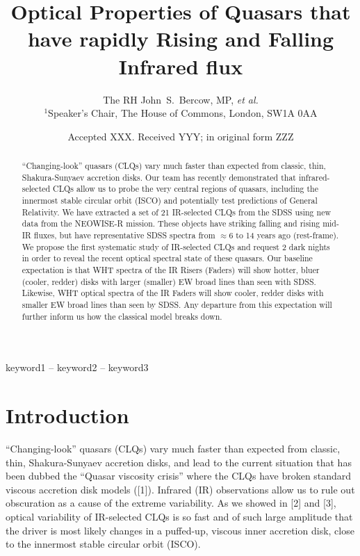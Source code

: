 \documentclass[a4paper,fleqn,usenatbib]{mnras}
\title[Infrared CLQs from WHT]
{Optical Properties of Quasars that have rapidly Rising and Falling Infrared flux}
\author[Bercow]
{The RH John~S.~Bercow, MP, {\it et al.} 
\\
$^{1}$Speaker's Chair, The House of Commons, London, SW1A 0AA \\
}
\date{Accepted XXX. Received YYY; in original form ZZZ}
\begin{document}
\label{firstpage}
\pagerange{\pageref{firstpage}--\pageref{lastpage}}
\maketitle

\begin{abstract}
``Changing-look'' quasars (CLQs) vary much faster than expected from
classic, thin, Shakura-Sunyaev accretion disks. Our team has recently
demonstrated that infrared-selected CLQs allow us to probe the very
central regions of quasars, including the innermost stable circular
orbit (ISCO) and potentially test predictions of General
Relativity. We have extracted a set of 21 IR-selected CLQs from the
SDSS using new data from the NEOWISE-R mission. These objects have
striking falling and rising mid-IR fluxes, but have representative
SDSS spectra from $\approx$6 to 14 years ago (rest-frame).  We propose
the first systematic study of IR-selected CLQs and request 2 dark
nights in order to reveal the recent optical spectral state of these
quasars. Our baseline expectation is that WHT spectra of the IR Risers
(Faders) will show hotter, bluer (cooler, redder) disks with larger
(smaller) EW broad lines than seen with SDSS. Likewise, WHT optical
spectra of the IR Faders will show cooler, redder disks with smaller
EW broad lines than seen by SDSS. Any departure from this expectation
will further inform us how the classical model breaks down.
\end{abstract}

\begin{keywords}
keyword1 -- keyword2 -- keyword3
\end{keywords}




\section{Introduction}
``Changing-look'' quasars (CLQs) vary much faster than expected from
classic, thin, Shakura-Sunyaev accretion disks, and lead to the
current situation that has been dubbed the ``Quasar viscosity crisis''
where the CLQs have broken standard viscous accretion disk models
([1]). Infrared (IR) observations allow us to rule out obscuration as
a cause of the extreme variability. As we showed in [2] and [3],
optical variability of IR-selected CLQs is so fast and of such large
amplitude that the driver is most likely changes in a puffed-up,
viscous inner accretion disk, close to the innermost stable circular
orbit (ISCO).
\end{document}
